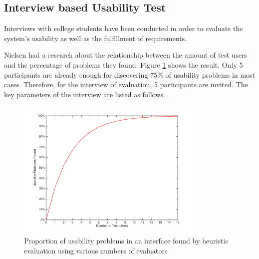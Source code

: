 


\subsection{Interview based Usability Test}

Interviews with college students have been conducted in order to evaluate the system's usability as well as the fulfillment of requirements. 

Nielsen had a research about the relationship between the amount of test users and the percentage of problems they found. Figure \ref{fig:eval-nielsen} shows the result\cite{nielsen2001conduct}. Only 5 participants are already enough for discovering 75\% of usability problems in most cases. Therefore, for the interview of evaluation, 5 participants are invited. The key parameters of the interview are listed as follows. 

\begin{figure}[!htbp]
  \centering
    \includegraphics[width=0.8\textwidth]{Figures/eval-nielsen.png}
  \caption{Proportion of usability problems in an interface found by heuristic evaluation using various numbers of evaluators}
  \label{fig:eval-nielsen}
\end{figure}

